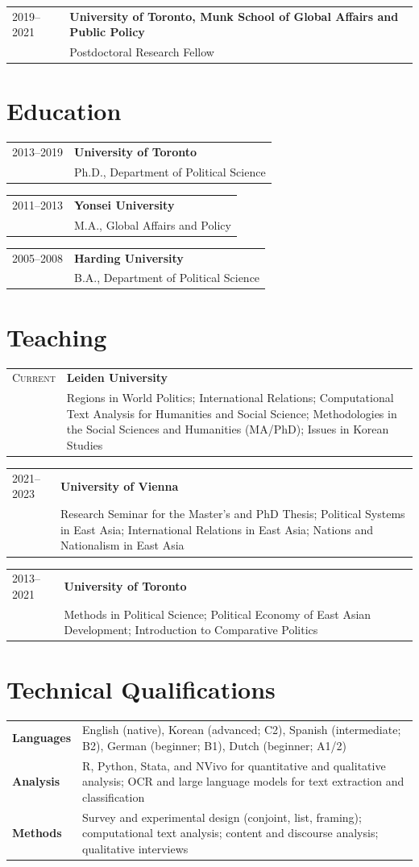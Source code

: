 \documentclass[11pt, a4paper]{article}
\makeatletter
\newcommand{\cventry}[3]{%
  \noindent
  \begin{tabularx}{\textwidth}{@{}p{2.4cm}X@{}}
    \textsc{#1} & \textbf{#2} \\
                 & #3
  \end{tabularx}\vspace{0.15em}%
}
\makeatother
\begin{document}
\cventry{2019--2021}{University of Toronto, Munk School of Global Affairs and Public Policy}
  {Postdoctoral Research Fellow}

\vfill

\section{Education}

\cventry{2013--2019}{University of Toronto}
  {Ph.D., Department of Political Science}

\cventry{2011--2013}{Yonsei University}
  {M.A., Global Affairs and Policy}

\cventry{2005--2008}{Harding University}
  {B.A., Department of Political Science}

\vfill

\section{Teaching}

\cventry{Current}{Leiden University}
  {Regions in World Politics; International Relations; Computational Text Analysis for Humanities and Social Science; Methodologies in the Social Sciences and Humanities (MA/PhD); Issues in Korean Studies}

\cventry{2021--2023}{University of Vienna}
  {Research Seminar for the Master's and PhD Thesis; Political Systems in East Asia; International Relations in East Asia; Nations and Nationalism in East Asia}

\cventry{2013--2021}{University of Toronto}
  {Methods in Political Science; Political Economy of East Asian Development; Introduction to Comparative Politics}

\vfill

\section{Technical Qualifications}

\noindent\begin{tabularx}{\textwidth}{@{}p{2.4cm}X@{}}
  \textbf{Languages} & English (native), Korean (advanced; C2), Spanish (intermediate; B2), German (beginner; B1), Dutch (beginner; A1/2) \\[0.5em]
  \textbf{Analysis} & R, Python, Stata, and NVivo for quantitative and qualitative analysis; OCR and large language models for text extraction and classification \\[0.5em]
  \textbf{Methods} & Survey and experimental design (conjoint, list, framing); computational text analysis; content and discourse analysis; qualitative interviews
\end{tabularx}
\end{document}
